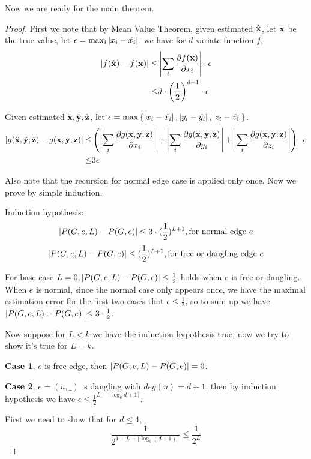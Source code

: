 	Now we are ready for the main theorem.

	\begin{proof}
		First we note that by Mean Value Theorem,
		given estimated $\hat{\bf x}$, let ${\bf x}$ be the true value, let $\epsilon = \max_i{\left\vert x_i - \hat{x_i}\right\vert}$.
		we have for $d$-variate function $f$,
		\begin{align*}
		\left\vert f(\hat{\bf x}) - f({\bf x})\right\vert \leq& \left\vert\sum_i \frac{\partial f({\bf x})}{\partial x_i}\right\vert \cdot \epsilon \\
		\leq & d\cdot \left( \frac{1}{2} \right)^{d-1} \cdot \epsilon
		\end{align*}

		Given estimated $\hat{\bf x},\hat{\bf y},\hat{\bf z}$, let $\epsilon = \max \left\{\left\vert x_i - \hat{x_i}\right\vert, \left\vert y_i - \hat{y_i} \right\vert , \left\vert z_i - \hat{z_i}\right\vert\right\}$.
		\begin{align*}
		\left\vert g(\hat{\bf x}, \hat{\bf y}, \hat{\bf z}) - g({\bf x,y,z})\right\vert \leq & \left(  \left\vert\sum_i \frac{\partial g({\bf x,y,z})}{\partial x_i}\right\vert +\left\vert \sum_i \frac{\partial g({\bf x,y,z})}{\partial y_i}\right\vert + \left\vert \sum_i \frac{\partial g({\bf x,y,z})}{\partial z_i}\right\vert \right) \cdot \epsilon \\
		\leq & 3\epsilon
		\end{align*}


		Also note that the recursion for normal edge case is applied only once.
		Now we prove by simple induction.

		Induction hypothesis:
		\[\left\vert P(G,e,L) - P(G,e)\right\vert \leq 3\cdot(\frac{1}{2})^{L+1}, \textrm{for normal edge $e$}\]
		\[\left\vert P(G,e,L) - P(G,e)\right\vert \leq (\frac{1}{2})^{L+1}, \textrm{for free or dangling edge $e$}\]
		
		For base case $L=0, \left\vert P(G,e,L) - P(G,e)\right\vert \leq \frac{1}{2}$ holds when $e$ is free or dangling. When $e$ is normal, since the normal case only appears once, we have the maximal estimation error for the first two cases that $\epsilon \leq \frac{1}{2}$, so to sum up we have $\left\vert P(G,e,L) - P(G,e)\right\vert \leq 3\cdot\frac{1}{2}$.

		Now suppose for $L<k$ we have the induction hypothesis true, now we try to show it's true for $L=k$.

		{\bf Case 1}, $e$ is free edge, then $\left\vert P(G,e,L) - P(G,e)\right\vert = 0$.

		{\bf Case 2}, $e=(u,\_)$ is dangling with $deg(u)=d+1$, then by induction hypothesis we have 
		$\epsilon \leq \frac{1}{2}^{L-\lceil \log_6{d+1}\rceil}$.

		First we need to show that for $d \leq 4$,
		\[\frac{1}{2^{1+L-\lceil \log_6{(d+1)}\rceil}} \leq \frac{1}{2^L}\]


\end{proof}
